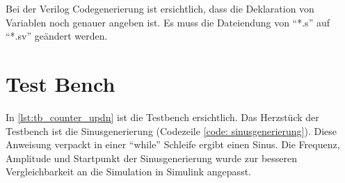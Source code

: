 \documentclass[./\jobname.tex]{subfiles}
\begin{document}
%
%
\begin{figure}[H]
	\centering
	\noindent{}
	\label{fig: Simulink Implementierung 5}
\end{figure}
%
\begin{figure}[H]
	\centering
	\noindent{}
	\label{fig: Simulink Implementierung 6}
\end{figure}
%
Bei der Verilog Codegenerierung ist ersichtlich, dass die Deklaration von Variablen noch genauer angeben ist. Es muss die Dateiendung von \enquote{*.s} auf \enquote{*.sv} geändert werden.
%

%
\section{Test Bench}
%
In \autoref{lst:tb_counter_updn} ist die Testbench ersichtlich. Das Herzstück der Testbench ist die Sinusgenerierung (Codezeile \ref{code: sinusgenerierung}). Diese Anweisung verpackt in einer \enquote{while} Schleife ergibt einen Sinus. Die Frequenz, Amplitude und Startpunkt der Sinusgenerierung wurde zur besseren Vergleichbarkeit an die Simulation in Simulink angepasst.
%

%
\end{document}
